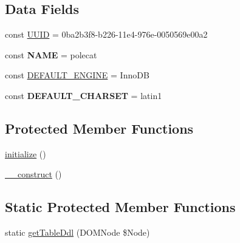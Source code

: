\subsection*{Data Fields}
\begin{DoxyCompactItemize}
\item 
const \hyperlink{class_able_polecat___database___schema_a74b892c8c0b86bf9d04c5819898c51e7}{U\+U\+I\+D} = \textquotesingle{}0ba2b3f8-\/b226-\/11e4-\/976e-\/0050569e00a2\textquotesingle{}
\item 
\hypertarget{class_able_polecat___database___schema_a244352f035b82b20b0efa506167fd862}{}const {\bfseries N\+A\+M\+E} = \textquotesingle{}polecat\textquotesingle{}\label{class_able_polecat___database___schema_a244352f035b82b20b0efa506167fd862}

\item 
const \hyperlink{class_able_polecat___database___schema_a921ab3a450876154197d5160a5432dce}{D\+E\+F\+A\+U\+L\+T\+\_\+\+E\+N\+G\+I\+N\+E} = \textquotesingle{}Inno\+D\+B\textquotesingle{}
\item 
\hypertarget{class_able_polecat___database___schema_a449bb85ba80e8d48f050f1946694c2e6}{}const {\bfseries D\+E\+F\+A\+U\+L\+T\+\_\+\+C\+H\+A\+R\+S\+E\+T} = \textquotesingle{}latin1\textquotesingle{}\label{class_able_polecat___database___schema_a449bb85ba80e8d48f050f1946694c2e6}

\end{DoxyCompactItemize}
\subsection*{Protected Member Functions}
\begin{DoxyCompactItemize}
\item 
\hyperlink{class_able_polecat___database___schema_a91098fa7d1917ce4833f284bbef12627}{initialize} ()
\item 
\hyperlink{class_able_polecat___database___schema_a095c5d389db211932136b53f25f39685}{\+\_\+\+\_\+construct} ()
\end{DoxyCompactItemize}
\subsection*{Static Protected Member Functions}
\begin{DoxyCompactItemize}
\item 
static \hyperlink{class_able_polecat___database___schema_a1af59e74db50d63266e17427f1d9f641}{get\+Table\+Ddl} (D\+O\+M\+Node \$Node)
\end{DoxyCompactItemize}


